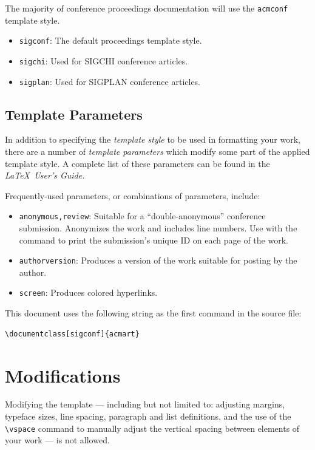 \documentclass[sigconf, review]{acmart}
\begin{document}
The majority of conference proceedings documentation will use the {\verb|acmconf|} template style.
\begin{itemize}
\item {\texttt{sigconf}}: The default proceedings template style.
\item{\texttt{sigchi}}: Used for SIGCHI conference articles.
\item{\texttt{sigplan}}: Used for SIGPLAN conference articles.
\end{itemize}

\subsection{Template Parameters}

In addition to specifying the {\itshape template style} to be used in
formatting your work, there are a number of {\itshape template parameters}
which modify some part of the applied template style. A complete list
of these parameters can be found in the {\itshape \LaTeX\ User's Guide.}

Frequently-used parameters, or combinations of parameters, include:
\begin{itemize}
\item {\texttt{anonymous,review}}: Suitable for a ``double-anonymous''
  conference submission. Anonymizes the work and includes line
  numbers. Use with the \texttt{\string\acmSubmissionID} command to print the
  submission's unique ID on each page of the work.
\item{\texttt{authorversion}}: Produces a version of the work suitable
  for posting by the author.
\item{\texttt{screen}}: Produces colored hyperlinks.
\end{itemize}

This document uses the following string as the first command in the
source file:
\begin{verbatim}
\documentclass[sigconf]{acmart}
\end{verbatim}

\section{Modifications}

Modifying the template --- including but not limited to: adjusting
margins, typeface sizes, line spacing, paragraph and list definitions,
and the use of the \verb|\vspace| command to manually adjust the
vertical spacing between elements of your work --- is not allowed.
\end{document}
